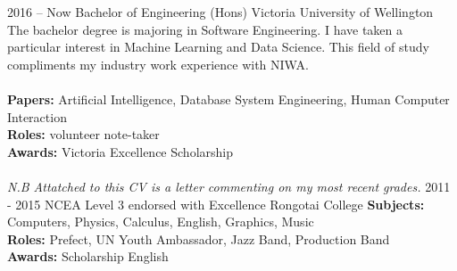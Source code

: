 \documentclass[9pt]{developercv}
\begin{document}


\begin{entrylist}
	\entry
		{2016 -- Now}
		{Bachelor of Engineering (Hons)}
		{Victoria University of Wellington}
		{
			The bachelor degree is majoring in Software Engineering. I have taken a particular interest in Machine Learning and Data Science. This field of study compliments my industry work experience with NIWA.
			\\\\
			\textbf{Papers:} Artificial Intelligence, Database System Engineering, Human Computer Interaction \\
			\textbf{Roles:} volunteer note-taker \\
			\textbf{Awards:} Victoria Excellence Scholarship \\\\
			\emph{N.B Attatched to this CV is a letter commenting on my most recent grades.}
		}
	\entry
		{2011 - 2015}
		{NCEA Level 3 endorsed with Excellence}
		{Rongotai College}
		{
			\textbf{Subjects:} Computers, Physics, Calculus, English, Graphics, Music \\
			\textbf{Roles:} Prefect, UN Youth Ambassador, Jazz Band, Production Band \\
			\textbf{Awards:} Scholarship English
		}
\end{entrylist}


\end{document}
